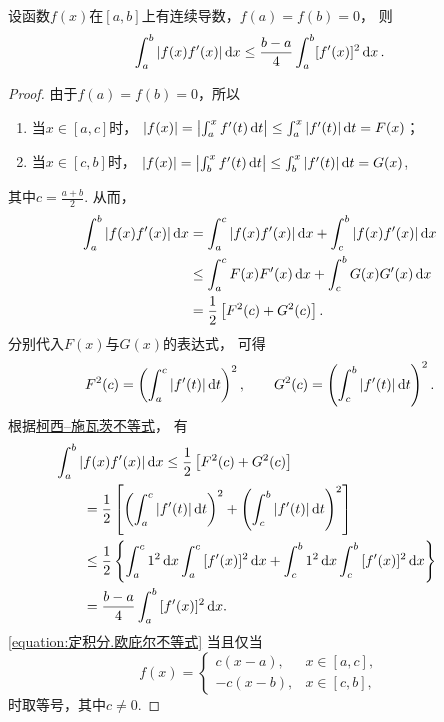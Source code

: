 \begin{theorem}[欧庇尔不等式]\label{theorem:定积分.欧庇尔不等式}
设函数\(f(x)\)在\([a,b]\)上有连续导数，\(f(a)=f(b)=0\)，
则\begin{equation}\label{equation:定积分.欧庇尔不等式}
	\int_a^b \abs{f(x) f'(x)} \dd{x}
	\leq \frac{b-a}{4}
	\int_a^b [f'(x)]^2 \dd{x}.
\end{equation}
\begin{proof}
由于\(f(a)=f(b)=0\)，所以\begin{enumerate}
	\item 当\(x \in \left[a,c\right]\)时，
	\(\abs{f(x)} = \abs{\int_a^x f'(t) \dd{t}} \leq \int_a^x \abs{f'(t)} \dd{t} = F(x)\)；
	\item 当\(x \in \left[c,b\right]\)时，
	\(\abs{f(x)} = \abs{\int_b^x f'(t) \dd{t}} \leq \int_b^x \abs{f'(t)} \dd{t} = G(x)\),
\end{enumerate}
其中\(c=\frac{a+b}{2}\).
从而，\begin{align*}
	\int_a^b \abs{f(x) f'(x)} \dd{x}
	&= \int_a^c \abs{f(x) f'(x)} \dd{x}
		+ \int_c^b \abs{f(x) f'(x)} \dd{x} \\
	&\leq \int_a^c F(x) F'(x) \dd{x}
		+ \int_c^b G(x) G'(x) \dd{x} \\
	&= \frac{1}{2} \left[ F^2(c) + G^2(c) \right].
\end{align*}
分别代入\(F(x)\)与\(G(x)\)的表达式，
可得\[
	F^2(c) = \left( \int_a^c \abs{f'(t)} \dd{t} \right)^2,
	\qquad
	G^2(c) = \left( \int_c^b \abs{f'(t)} \dd{t} \right)^2.
\]
根据\hyperref[equation:定积分.柯西--施瓦茨不等式]{柯西--施瓦茨不等式}，
有\begin{align*}
	&\hspace{-20pt}\int_a^b{\abs{f(x) f'(x)} \dd{x}}
	\leq \frac{1}{2} \left[
		F^2(c)
		+ G^2(c)
		\right] \\
	&= \frac{1}{2} \left[
		\left(\int_a^c{\abs{f'(t)}\dd{t}}\right)^2
		+\left(\int_c^b{\abs{f'(t)}\dd{t}}\right)^2
		\right] \\
	&\leq \frac{1}{2} \left\{
		\int_a^c{1^2 \dd{x}}
		\int_a^c{[f'(x)]^2 \dd{x}}
		+\int_c^b{1^2 \dd{x}}
		\int_c^b{[f'(x)]^2 \dd{x}}
		\right\} \\
	&= \frac{b-a}{4} \int_a^b{[f'(x)]^2 \dd{x}}.
\end{align*}
\cref{equation:定积分.欧庇尔不等式} 当且仅当\[
	f(x) = \left\{ \begin{array}{cl}
		c(x-a), & x\in\left[a,c\right], \\
		-c(x-b), & x\in\left[c,b\right],
	\end{array} \right.
\]时取等号，其中\(c\neq0\).
\end{proof}
\end{theorem}

